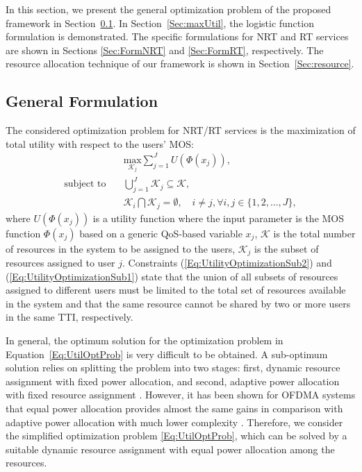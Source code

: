 \documentclass[12pt]{article}
\newcommand{\SecRef}[1]{Section~\ref{#1}}
\newcommand{\EqRef}[1]{Equation~\ref{#1}}
\begin{document}
In this section, we present the general optimization problem of the proposed framework in \SecRef{Sec:GeneralForm}. In \SecRef{Sec:maxUtil}, the logistic function formulation is demonstrated. The specific formulations for \ac{NRT} and \ac{RT} services are shown in Sections \ref{Sec:FormNRT} and \ref{Sec:FormRT}, respectively. The resource allocation technique of our framework is shown in \SecRef{Sec:resource}.

\subsection{General Formulation}
\label{Sec:GeneralForm}

The considered optimization problem for \ac{NRT}/\ac{RT} services is the maximization of total utility with respect to the users' MOS:
\begin{subequations}\label{Eq:UtilOptProb}
	\begin{align}
	&\underset{\mathcal{K}_j}{\text{max}} \sum_{j=1}^{J} U\left(\Phi(x_j)\right), \label{Eq:UtilityOptimization}\\
	\text{subject to} \quad 
	&\bigcup_{j=1}^{J} \mathcal{K}_j \subseteq \mathcal{K}, \label{Eq:UtilityOptimizationSub1}\\ 
	&\mathcal{K}_{i} \bigcap \mathcal{K}_j = \emptyset, \quad i \neq j,  \forall i,j \in \{1,2, \ldots, J\},\label{Eq:UtilityOptimizationSub2}
	\end{align}
\end{subequations}
%
where $U(\Phi(x_j))$ is a utility function where the input parameter is the \ac{MOS} function $\Phi(x_j)$ based on a generic QoS-based variable $x_j$, $\mathcal{K}$ is the total number of resources in the system to be assigned to the users, $\mathcal{K}_j$ is the subset of resources assigned to user $j$. Constraints (\ref{Eq:UtilityOptimizationSub2}) and (\ref{Eq:UtilityOptimizationSub1}) state that the union of all subsets of resources assigned to different users must be limited to the total set of resources available in the system and that the same resource cannot be shared by two or more users in the same \ac{TTI}, respectively. 

In general, the optimum solution for the optimization problem in \EqRef{Eq:UtilOptProb} is very difficult to be obtained. A sub-optimum solution relies on splitting the problem into two stages: first, dynamic resource assignment with fixed power allocation, and second, adaptive power allocation with fixed resource assignment \cite{Gross2006}. However, it has been shown for \ac{OFDMA} systems that equal power allocation provides almost the same gains in comparison with adaptive power allocation with much lower complexity \cite{Andrews2001}. Therefore, we consider the simplified optimization problem \eqref{Eq:UtilOptProb}, which can be solved by a suitable dynamic resource assignment
with equal power allocation among the resources. 
\end{document}
